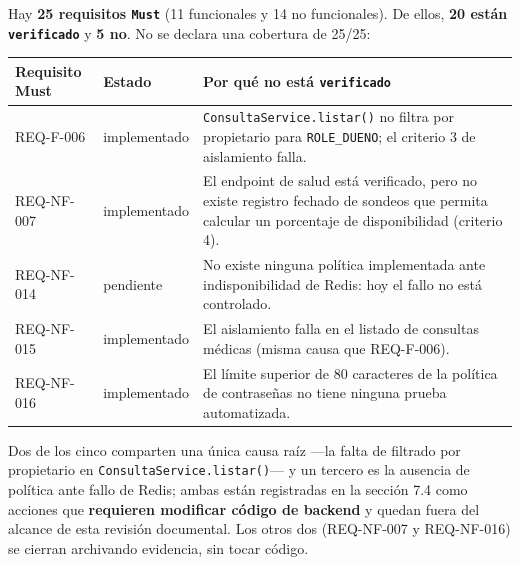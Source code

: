 \documentclass[
  spanish,
]{article}
\newcounter{none} %
\begin{document}
Hay \textbf{25 requisitos \texttt{Must}} (11 funcionales y 14 no
funcionales). De ellos, \textbf{20 están \texttt{verificado}} y
\textbf{5 no}. No se declara una cobertura de 25/25:

{\def\LTcaptype{none} %
\begin{longtable}[]{@{}
  >{\raggedright\arraybackslash}p{}
  >{\raggedright\arraybackslash}p{}
  >{\raggedright\arraybackslash}p{}@{}}
\toprule\noalign{}
\begin{minipage}[b]{\linewidth}\raggedright
Requisito Must
\end{minipage} & \begin{minipage}[b]{\linewidth}\raggedright
Estado
\end{minipage} & \begin{minipage}[b]{\linewidth}\raggedright
Por qué no está \texttt{verificado}
\end{minipage} \\
\midrule\noalign{}
\endhead
\bottomrule\noalign{}
\endlastfoot
REQ-F-006 & implementado & \texttt{Consulta\allowbreak{}Service.\allowbreak{}listar()} no filtra
por propietario para \texttt{ROLE\_\allowbreak{}DUENO}; el criterio 3 de aislamiento
falla. \\
REQ-NF-007 & implementado & El endpoint de salud está verificado, pero
no existe registro fechado de sondeos que permita calcular un porcentaje
de disponibilidad (criterio 4). \\
REQ-NF-014 & pendiente & No existe ninguna política implementada ante
indisponibilidad de Redis: hoy el fallo no está controlado. \\
REQ-NF-015 & implementado & El aislamiento falla en el listado de
consultas médicas (misma causa que REQ-F-006). \\
REQ-NF-016 & implementado & El límite superior de 80 caracteres de la
política de contraseñas no tiene ninguna prueba automatizada. \\
\end{longtable}
}

Dos de los cinco comparten una única causa raíz ---la falta de filtrado
por propietario en \texttt{Consulta\allowbreak{}Service.\allowbreak{}listar()}--- y un tercero es
la ausencia de política ante fallo de Redis; ambas están registradas en
la sección 7.4 como acciones que \textbf{requieren modificar código de
backend} y quedan fuera del alcance de esta revisión documental. Los
otros dos (REQ-NF-007 y REQ-NF-016) se cierran archivando evidencia, sin
tocar código.
\end{document}
